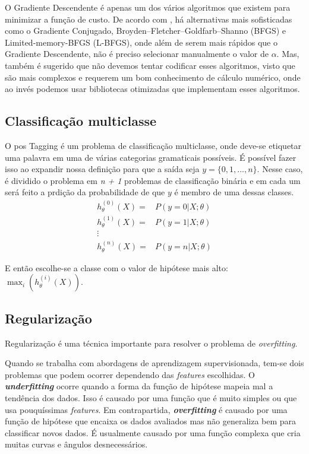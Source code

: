 O Gradiente Descendente é apenas um dos vários algoritmos que existem para minimizar a função de custo. De acordo com , há alternativas mais sofisticadas como o Gradiente Conjugado, Broyden–Fletcher–Goldfarb–Shanno (BFGS) e Limited-memory-BFGS (L-BFGS), onde além de serem mais rápidos que o Gradiente Descendente, não é preciso selecionar manualmente o valor de $\alpha$. Mas, também é sugerido que não devemos tentar codificar esses algoritmos, visto que são mais complexos e requerem um bom conhecimento de cálculo numérico, onde ao invés podemos usar bibliotecas otimizadas que implementam esses algoritmos.


\subsection{Classificação multiclasse}

O \ac{pos} Tagging é um problema de classificação multiclasse, onde deve-se etiquetar uma palavra em uma de várias categorias gramaticais possíveis. É possível fazer isso ao expandir nossa definição para que a saída seja $y = \{0, 1, ..., n\}$. Nesse caso, é dividido o problema em \textit{n + 1} problemas de classificação binária e em cada um será feito a prdição da probabilidade de que $y$ é membro de uma dessas classes.
\begin{align}
h_{\theta}^{(0)}(X) =&  P(y=0 | X ; \theta) \nonumber \\
h_{\theta}^{(1)}(X) =&  P(y=1 | X ; \theta) \nonumber \\
\vdots & \nonumber \\
h_{\theta}^{(n)}(X) =&  P(y=n | X ; \theta) \nonumber
\end{align}

E então escolhe-se a classe com o valor de hipótese mais alto: $ \max_i(h_{\theta}^{(i)}(X)) $.


\subsection{Regularização}\label{subsec:regularizacao}

Regularização é uma técnica importante para resolver o problema de \textit{overfitting}.

Quando se trabalha com abordagens de aprendizagem supervisionada, tem-se dois problemas que podem ocorrer dependendo das \textit{features} escolhidas. O \textbf{\textit{underfitting}} ocorre quando a forma da função de hipótese mapeia mal a tendência dos dados. Isso é causado por uma função que é muito simples ou que usa pouquíssimas \textit{features}. Em contrapartida, \textbf{\textit{overfitting}} é causado por uma função de hipótese que encaixa os dados avaliados mas não generaliza bem para classificar novos dados. É usualmente causado por uma função complexa que cria muitas curvas e ângulos desnecessários.


